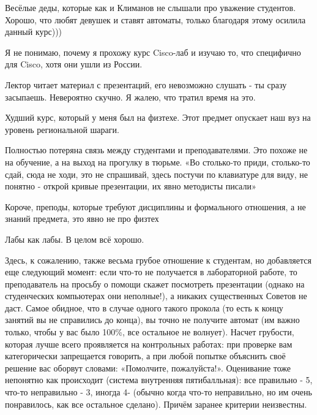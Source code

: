             \begin{commentbox} 
                Весёлые деды, которые как и Климанов не слышали про уважение студентов. Хорошо, что любят девушек и ставят автоматы, только благодаря этому осилила данный курс))) 
            \end{commentbox} 
        
            \begin{commentbox} 
                Я не понимаю, почему я прохожу курс Cisco-лаб и изучаю то, что специфично для Cisco, хотя они ушли из России.
        
                Лектор читает материал с презентаций, его невозможно слушать - ты сразу засыпаешь. Невероятно скучно. Я жалею, что тратил время на это. 
            \end{commentbox} 
        
            \begin{commentbox} 
                Худший курс, который у меня был на физтехе. Этот предмет опускает наш вуз на уровень региональной шараги. 
        
                Полностью потеряна связь между студентами и преподавателями. Это похоже не на обучение, а на выход на прогулку в тюрьме. «Во столько-то приди, столько-то сдай, сюда не ходи, это не спрашивай, здесь постучи по клавиатуре для виду, не понятно - открой кривые презентации, их явно методисты писали»
                
                Короче, преподы, которые требуют дисциплины и формального отношения, а не знаний предмета, это явно не про физтех 
            \end{commentbox} 
        
            \begin{commentbox} 
                Лабы как лабы. В целом всё хорошо. 
            \end{commentbox} 
        
            \begin{commentbox} 
                Здесь, к сожалению, также весьма грубое отношение к студентам, но добавляется еще следующий момент: если что-то не получается в лабораторной работе, то преподаватель на просьбу о помощи скажет посмотреть презентации (однако на студенческих компьютерах они неполные!), а никаких существенных Советов не даст. Самое обидное, что в случае одного такого прокола (то есть к концу занятий вы не справились до конца), вы точно не получите автомат (им важно только, чтобы у вас было 100\%, все остальное не волнует). Насчет грубости, которая лучше всего проявляется на контрольных работах: при проверке вам категорически запрещается говорить, а при любой попытке объяснить своё решение вас оборвут словами: «Помолчите, пожалуйста!». Оценивание тоже непонятно как происходит (система внутренняя пятибалльная): все правильно - 5, что-то неправильно - 3, иногда 4- (обычно когда что-то неправильно, но им очень понравилось, как все остальное сделано). Причём заранее критерии неизвестны. 
            \end{commentbox} 
        
